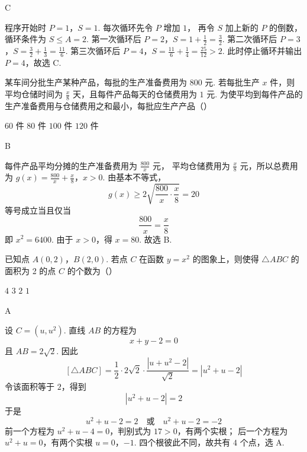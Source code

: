\begin{answer}
C
\end{answer}

\begin{solution}
程序开始时 \(P=1\)，\(S=1\). 每次循环先令 \(P\) 增加 \(1\)，
再令 \(S\) 加上新的 \(P\) 的倒数，循环条件为 \(S\leqslant A=2\).
第一次循环后
\(P=2\)，\(S=1+\frac{1}{2}=\frac{3}{2}\).
第二次循环后
\(P=3\)，\(S=\frac{3}{2}+\frac{1}{3}=\frac{11}{6}\).
第三次循环后
\(P=4\)，\(S=\frac{11}{6}+\frac{1}{4}=\frac{25}{12}>2\).
此时停止循环并输出 \(P=4\)，故选 C.
\end{solution}

\begin{problem}
某车间分批生产某种产品，每批的生产准备费用为 \(800\text{ 元}\). 若每批生产 \(x\) 件，则平均仓储时间为 \(\frac{x}{8}\text{ 天}\)，且每件产品每天的仓储费用为 \(1\text{ 元}\). 为使平均到每件产品的生产准备费用与仓储费用之和最小，每批应生产产品（\quad）

\choices
    {\(60\text{ 件}\)}
    {\(80\text{ 件}\)}
    {\(100\text{ 件}\)}
    {\(120\text{ 件}\)}
\end{problem}

\begin{answer}
B
\end{answer}

\begin{solution}
每件产品平均分摊的生产准备费用为 \(\frac{800}{x}\) 元，
平均仓储费用为 \(\frac{x}{8}\) 元，所以总费用为
\(g(x)=\frac{800}{x}+\frac{x}{8}\)，\(x>0\).
由基本不等式，
\[
g(x)\geqslant 2\sqrt{\frac{800}{x}\cdot\frac{x}{8}}
=20
\]
等号成立当且仅当
\[
\frac{800}{x}=\frac{x}{8}
\]
即 \(x^{2}=6400\). 由于 \(x>0\)，得 \(x=80\).
故选 B.
\end{solution}

\begin{problem}
已知点 \(A(0,2)\)，\(B(2,0)\). 若点 \(C\) 在函数 \(y = x^2\) 的图象上，则使得 \(\triangle ABC\) 的面积为 2 的点 \(C\) 的个数为（\quad）

\choices
    {\(4\)}
    {\(3\)}
    {\(2\)}
    {\(1\)}
\end{problem}

\begin{answer}
A
\end{answer}

\begin{solution}
设 \(C=(u,u^{2})\). 直线 \(AB\) 的方程为
\[
x+y-2=0
\]
且 \(AB=2\sqrt{2}\). 因此
\[
[\triangle ABC]
=\frac{1}{2}\cdot2\sqrt{2}\cdot
\frac{|u+u^{2}-2|}{\sqrt{2}}
=|u^{2}+u-2|
\]
令该面积等于 \(2\)，得到
\[
|u^{2}+u-2|=2
\]
于是
\[
u^{2}+u-2=2
\quad\text{或}\quad
u^{2}+u-2=-2
\]
前一个方程为 \(u^{2}+u-4=0\)，判别式为 \(17>0\)，有两个实根；
后一个方程为 \(u^{2}+u=0\)，有两个实根 \(u=0\)，\(-1\).
四个根彼此不同，故共有 \(4\) 个点，选 A.
\end{solution}

